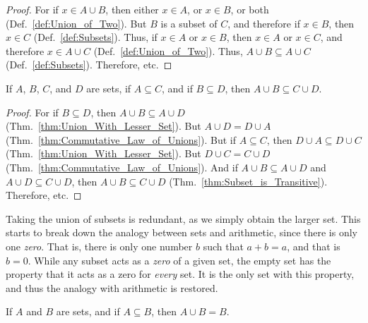 \documentclass[crop=false,class=book,oneside]{standalone}
\begin{document}
            \begin{proof}
                For if $x\in{A}\cup{B}$, then either $x\in{A}$,
                or $x\in{B}$, or both
                (Def.~\ref{def:Union_of_Two}). But $B$ is a
                subset of $C$, and therefore if $x\in{B}$, then
                $x\in{C}$ (Def.~\ref{def:Subsets}).
                Thus, if $x\in{A}$ or $x\in{B}$, then
                $x\in{A}$ or $x\in{C}$, and therefore
                $x\in{A}\cup{C}$ (Def.~\ref{def:Union_of_Two}).
                Thus, $A\cup{B}\subseteq{A}\cup{C}$
                (Def.~\ref{def:Subsets}). Therefore, etc.
            \end{proof}
            \begin{theorem}
                If $A$, $B$, $C$, and $D$ are sets, if
                $A\subseteq{C}$, and if $B\subseteq{D}$, then
                $A\cup{B}\subseteq{C}\cup{D}$.
            \end{theorem}
            \begin{proof}
                For if $B\subseteq{D}$, then
                $A\cup{B}\subseteq{A}\cup{D}$
                (Thm.~\ref{thm:Union_With_Lesser_Set}).
                But $A\cup{D}=D\cup{A}$
                (Thm.~\ref{thm:Commutative_Law_of_Unions}).
                But if $A\subseteq{C}$, then
                $D\cup{A}\subseteq{D}\cup{C}$
                (Thm.~\ref{thm:Union_With_Lesser_Set}). But
                $D\cup{C}=C\cup{D}$
                (Thm.~\ref{thm:Commutative_Law_of_Unions}).
                And if $A\cup{B}\subseteq{A}\cup{D}$ and
                $A\cup{D}\subseteq{C}\cup{D}$, then
                $A\cup{B}\subseteq{C}\cup{D}$
                (Thm.~\ref{thm:Subset_is_Transitive}).
                Therefore, etc.
            \end{proof}
            Taking the union of subsets is redundant, as we
            simply obtain the larger set. This starts to break
            down the analogy between sets and arithmetic, since
            there is only one \textit{zero}. That is, there is
            only one number $b$ such that $a+b=a$, and that is
            $b=0$. While any subset acts as a \textit{zero} of a
            given set, the empty set has the property that it
            acts as a zero for \textit{every} set. It is the only
            set with this property, and thus the analogy with
            arithmetic is restored.
            \begin{theorem}
                \label{thm:Union_With_Subset}%
                If $A$ and $B$ are sets, and if
                $A\subseteq{B}$, then $A\cup{B}=B$.
            \end{theorem}
\end{document}
